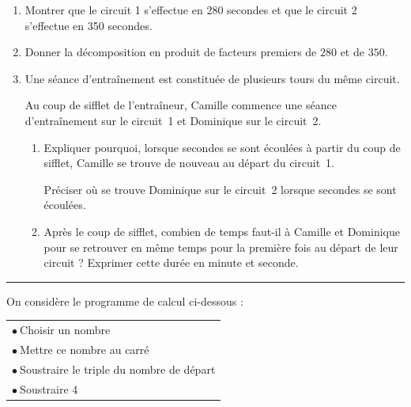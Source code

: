 \documentclass[a4paper,11pt]{article}
\newcommand{\np}[1]{\numprint{#1}}
\newcommand{\exercice}[2]{%
  \vspace{0.8cm}%
  \noindent\rule{\textwidth}{0.4pt}%
  \vspace{0.4cm}\par%
  \noindent{\Large\bfseries Exercice #1\hspace{0.3em}{\normalfont\normalsize(#2 points)}}%
  \par\vspace{0.5cm}%
}
\begin{document}
\begin{enumerate}[itemsep=4pt]
  \item Montrer que le circuit 1 s'effectue en 280 secondes et que le circuit 2 s'effectue en 350 secondes.
  \item Donner la décomposition en produit de facteurs premiers de $280$ et de $350$.
  \item Une séance d'entraînement est constituée de plusieurs tours du même circuit.

  Au coup de sifflet de l'entraîneur, Camille commence une séance d'entraînement sur le circuit~1 et Dominique sur le circuit~2.
  \begin{enumerate}[label=\alph*., itemsep=4pt]
    \item Expliquer pourquoi, lorsque \np{2800} secondes se sont écoulées à partir du coup de sifflet, Camille se trouve de nouveau au départ du circuit~1.

    Préciser où se trouve Dominique sur le circuit~2 lorsque \np{2800} secondes se sont écoulées.

    \item Après le coup de sifflet, combien de temps faut-il à Camille et Dominique pour se retrouver en même temps pour la première fois au départ de leur circuit ? Exprimer cette durée en minute et seconde.
  \end{enumerate}
\end{enumerate}

\exercice{3}{5}

On considère le programme de calcul ci-dessous :

\begin{center}
\begin{tabular}{|l|}
  \hline
  $\bullet~$Choisir un nombre \\
  $\bullet~$Mettre ce nombre au carré \\
  $\bullet~$Soustraire le triple du nombre de départ \\
  $\bullet~$Soustraire 4 \\
  \hline
\end{tabular}
\end{center}

\smallskip
\end{document}

